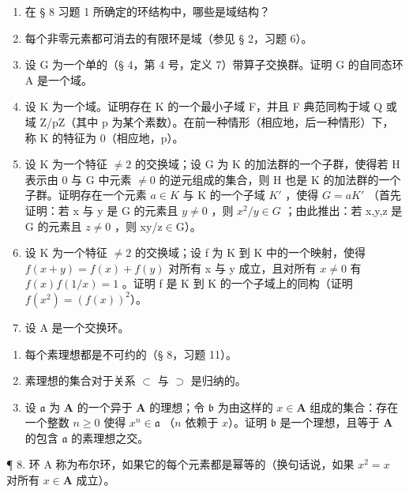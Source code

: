 \BourbakiExercisesSection

\begin{enumerate}
\def\labelenumi{\arabic{enumi}.}
\item
  在 § 8 习题 1 所确定的环结构中，哪些是域结构？
\item
  每个非零元素都可消去的有限环是域（参见 § 2，习题 6）。
\item
  设 G 为一个单的（§ 4，第 4 号，定义 7）带算子交换群。证明 G 的自同态环 A 是一个域。
\item
  设 K 为一个域。证明存在 K 的一个最小子域 F，并且 F 典范同构于域 Q 或域 Z/pZ（其中 p 为某个素数）。在前一种情形（相应地，后一种情形）下，称 K 的特征为 0（相应地，p）。
\item
  设 K 为一个特征 \(\neq2\) 的交换域；设 G 为 K 的加法群的一个子群，使得若 H 表示由 0 与 G 中元素 \(\neq0\) 的逆元组成的集合，则 H 也是 K 的加法群的一个子群。证明存在一个元素 \(a\in K\) 与 K 的一个子域 \(K'\) ，使得 \(G=aK'\) （首先证明：若 x 与 y 是 G 的元素且 \(y\neq0\) ，则 \(x^{2}/y\in G\) ；由此推出：若 x,y,z 是 G 的元素且 \(z\neq0\) ，则 xy/z\ensuremath{\in}G）。
\item
  设 K 为一个特征 \(\neq2\) 的交换域；设 f 为 K 到 K 中的一个映射，使得 \(f(x+y)=f(x)+f(y)\) 对所有 x 与 y 成立，且对所有 \(x\neq0\) 有 \(f(x)f(1/x)=1\) 。证明 f 是 K 到 K 的一个子域上的同构（证明 \(f(x^{2})=(f(x))^{2}\)）。
\item
  设 A 是一个交换环。
\end{enumerate}

\begin{enumerate}
\def\labelenumi{(\alph{enumi})}
\item
  每个素理想都是不可约的（§ 8，习题 11）。
\item
  素理想的集合对于关系 \(\subset\) 与 \(\supset\) 是归纳的。
\item
  设 \(\mathfrak{a}\) 为 \(\mathbf{A}\) 的一个异于 \(\mathbf{A}\) 的理想；令 \(\mathfrak{b}\) 为由这样的 \(x \in \mathbf{A}\) 组成的集合：存在一个整数 \(n \geqslant 0\) 使得 \(x^n \in \mathfrak{a}\) （\(n\) 依赖于 \(x\)）。证明 \(\mathfrak{b}\) 是一个理想，且等于 \(\mathbf{A}\) 的包含 \(\mathfrak{a}\) 的素理想之交。
\end{enumerate}

¶ 8. 环 A 称为布尔环，如果它的每个元素都是幂等的（换句话说，如果 \(x^2 = x\) 对所有 \(x \in \mathbf{A}\) 成立）。


